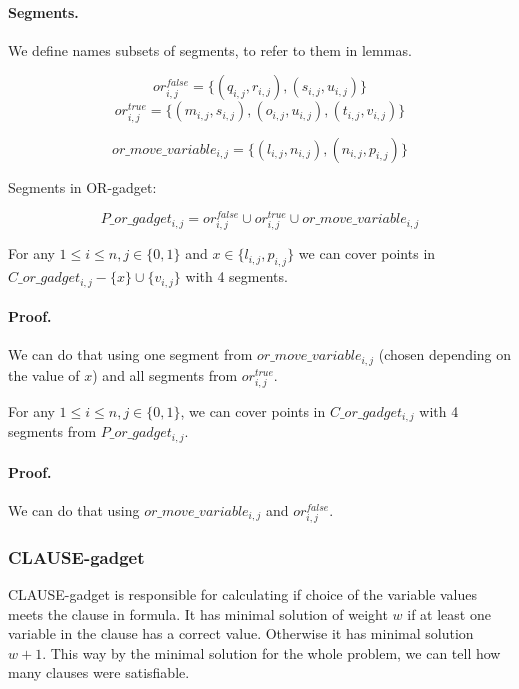 \paragraph{Segments.}

We define names subsets of segments, to refer to them in lemmas.
 
$$or^{false}_{i, j} =
\{ (q_{i, j}, r_{i, j}), (s_{i, j}, u_{i, j})\}$$
$$or^{true}_{i, j} =
\{ (m_{i, j}, s_{i, j}), (o_{i, j}, u_{i, j}),
(t_{i, j}, v_{i, j}) \}$$

$$or\_move\_variable_{i, j} =
\{ (l_{i, j}, n_{i, j}), (n_{i, j}, p_{i, j})\}$$

Segments in OR-gadget:

$$P\_or\_gadget_{i, j} = 
  or^{false}_{i, j} \cup or^{true}_{i, j} \cup or\_move\_variable_{i, j}
  $$


\begin{lemma}
\label{cover_or_true}
For any $1 \le i \le n, j \in \{0, 1\}$ and 
 $x \in \{l_{i, j}, p_{i, j}\}$ we can cover points in
$C\_or\_gadget_{i, j} - \{ x\} \cup \{v_{i, j}\}$
with 4 segments.
\end{lemma}

\paragraph{Proof.}
We can do that using one segment from
$or\_move\_variable_{i, j}$
(chosen depending on the value of $x$)
and all segments from $or^{true}_{i, j}$.

\begin{lemma}
\label{cover_or_false}
For any $1 \le i \le n, j \in \{0, 1\}$, we can cover points in
$C\_or\_gadget_{i, j}$ with 4 segments from $P\_or\_gadget_{i,j}$.
\end{lemma}
\paragraph{Proof.}
We can do that using  $or\_move\_variable_{i, j}$
and $or^{false}_{i, j}$.


\subsubsection{CLAUSE-gadget}


CLAUSE-gadget is responsible for calculating if choice of the
variable values meets the clause in formula.
It has minimal solution of weight $w$ if at least one variable
in the clause has a correct value.
Otherwise it has minimal solution $w+1$.
This way by the minimal solution for the whole problem, we can tell
how many clauses were satisfiable.

